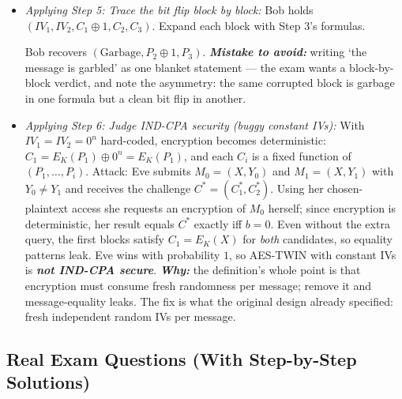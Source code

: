 \documentclass[12pt, a4paper]{article}
\newcommand{\term}[1]{\textbf{\textit{#1}}}        %
\begin{document}
\begin{itemize}
    \item \textit{Applying Step 5: Trace the bit flip block by block:} Bob holds $(IV_1, IV_2, C_1 \oplus 1, C_2, C_3)$. Expand each block with Step 3's formulas.  Bob recovers $(\text{Garbage}, P_2 \oplus 1, P_3)$. \term{Mistake to avoid:} writing `the message is garbled' as one blanket statement --- the exam wants a block-by-block verdict, and note the asymmetry: the same corrupted block is garbage in one formula but a clean bit flip in another.
    \item \textit{Applying Step 6: Judge IND-CPA security (buggy constant IVs):} With $IV_1 = IV_2 = 0^n$ hard-coded, encryption becomes deterministic: $C_1 = E_K(P_1) \oplus 0^n = E_K(P_1)$, and each $C_i$ is a fixed function of $(P_1, \dots, P_i)$. Attack: Eve submits $M_0 = (X, Y_0)$ and $M_1 = (X, Y_1)$ with $Y_0 \neq Y_1$ and receives the challenge $C^* = (C_1^*, C_2^*)$. Using her chosen-plaintext access she requests an encryption of $M_0$ herself; since encryption is deterministic, her result equals $C^*$ exactly iff $b = 0$. Even without the extra query, the first blocks satisfy $C_1 = E_K(X)$ for \emph{both} candidates, so equality patterns leak. Eve wins with probability $1$, so AES-TWIN with constant IVs is \term{not IND-CPA secure}. \term{Why:} the definition's whole point is that encryption must consume fresh randomness per message; remove it and message-equality leaks. The fix is what the original design already specified: fresh independent random IVs per message.
\end{itemize}

\subsection*{Real Exam Questions (With Step-by-Step Solutions)}
\end{document}
